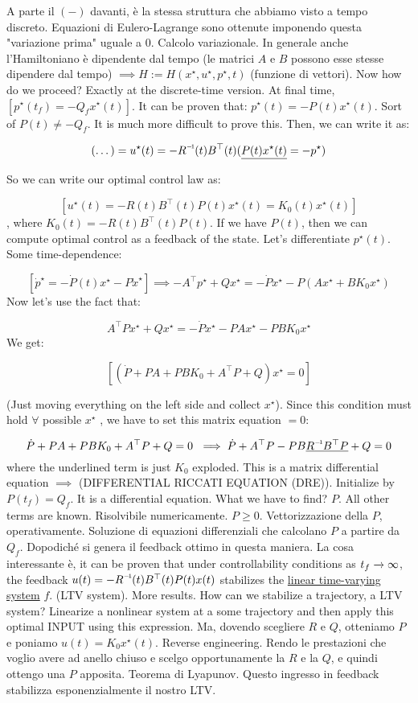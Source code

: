 A parte il $(-)$ davanti, è la stessa struttura che abbiamo visto a tempo discreto. Equazioni di Eulero-Lagrange sono ottenute imponendo questa "variazione prima" uguale a 0. Calcolo variazionale. In generale anche l'Hamiltoniano è dipendente dal tempo (le matrici $A$ e $B$ possono esse stesse dipendere dal tempo) $\implies H := H(x^\star,u^\star,p^\star,t)$ (funzione di vettori). Now how do we proceed? Exactly at the discrete-time version. At final time, $[p^\star(t_f) = -Q_fx^\star(t)]$. It can be proven that: $p^\star(t) = -P(t)x^\star(t)$. Sort of $P(t)\neq -Q_f$. It is much more difficult to prove this. Then, we can write it as:

\[
	(\dots) = u^\star(t) = -\inv{R}(t)B^\top(t)(\underline{P(t)x^\star(t)} = -p^\star)
\]

So we can write our optimal control law as:

\[
	[u^\star(t) = -R(t)B^\top(t)P(t)x^\star(t) = K_0(t)x^\star(t)]
\]
, where $K_0(t) = -R(t)B^\top(t)P(t)$. If we have $P(t)$, then we can compute optimal control as a feedback of the state. Let's differentiate $p^\star(t)$. Some time-dependence:

\[
	[\dot{p}^\star = -\dot{P}(t)x^\star - P\dot{x}^\star] \implies -A^\top p^\star + Qx^\star = -\dot{P}x^\star - P(Ax^\star + BK_0x^\star)
\]
Now let's use the fact that:

\[
	A^\top Px^\star + Qx^\star = -\dot{P}x^\star - PAx^\star - PBK_0x^\star
\]
We get:

\[
	[(\dot{P} + PA + PBK_0 + A^\top P + Q)x^\star = 0]
\]

(Just moving everything on the left side and collect $x^\star$). Since this condition must hold $\forall$ possible $x^\star$ , we have to set this matrix equation $= 0$:

\[
	\dot{P} + PA + PBK_0 + A^\top P + Q = 0\ \implies \dot{P} + A^\top P -PB\underline{\inv{R}B^\top P} + Q = 0
\]
where the underlined term is just $K_0$ exploded. This is a matrix differential equation $\implies$ (DIFFERENTIAL RICCATI EQUATION (DRE)). Initialize by $P(t_f) = Q_f$. It is a differential equation. What we have to find? $P$. All other terms are known. Risolvibile numericamente. $P\geq 0$. Vettorizzazione della $P$, operativamente. Soluzione di equazioni differenziali che calcolano $P$ a partire da $Q_f$. Dopodiché si genera il feedback ottimo in questa maniera.
La cosa interessante è, it can be proven that under controllability conditions as $t_f\tendsto{}\infty$, the feedback $u(t) = -\inv{R}(t)B^\top (t)P(t)x(t)$ stabilizes the \underline{linear time-varying system} $f$. (LTV system). More results. How can we stabilize a trajectory, a LTV system? Linearize a nonlinear system at a some trajectory and then apply this optimal INPUT using this expression. Ma, dovendo scegliere $R$ e $Q$, otteniamo $P$ e poniamo $u(t) = K_0x^\star(t)$. Reverse engineering. Rendo le prestazioni che voglio avere ad anello chiuso e scelgo opportunamente la $R$ e la $Q$, e quindi ottengo una $P$ apposita. Teorema di Lyapunov. Questo ingresso in feedback stabilizza esponenzialmente il nostro LTV.

